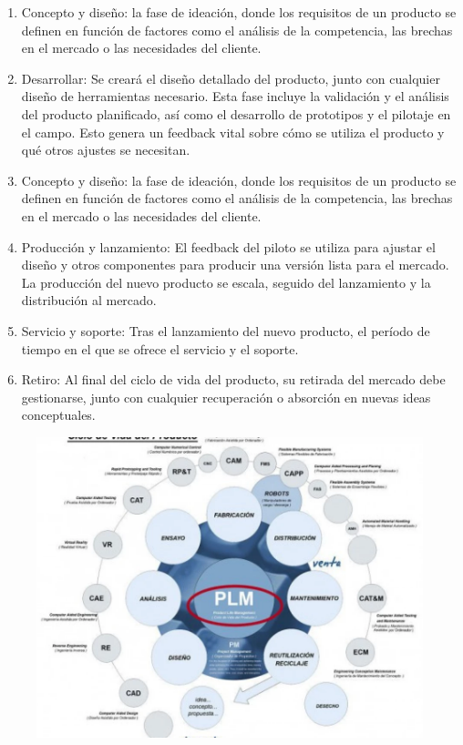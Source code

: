 \documentclass[12pt]{article}
\begin{document}
\begin{enumerate}
    \item Concepto y diseño: la fase de ideación, donde los requisitos de un producto se definen en función de factores como el análisis de la competencia, 
    las brechas en el mercado o las necesidades del cliente.
    \item Desarrollar: Se creará el diseño detallado del producto, junto con cualquier diseño de herramientas necesario. Esta fase incluye la validación y el 
    análisis del producto planificado, así como el desarrollo de prototipos y el pilotaje en el campo. Esto genera un feedback vital sobre cómo se utiliza el producto y qué otros ajustes se necesitan.
    \item Concepto y diseño: la fase de ideación, donde los requisitos de un producto se definen en función de factores como el análisis de la competencia, las brechas en el mercado o las necesidades 
    del cliente.
    \item Producción y lanzamiento: El feedback del piloto se utiliza para ajustar el diseño y otros componentes para producir una versión lista para el mercado. La producción del nuevo producto se escala, 
    seguido del lanzamiento y la distribución al mercado.
    \item Servicio y soporte: Tras el lanzamiento del nuevo producto, el período de tiempo en el que se ofrece el servicio y el soporte.
    \item Retiro: Al final del ciclo de vida del producto, su retirada del mercado debe gestionarse, junto con cualquier recuperación o absorción en nuevas ideas conceptuales.
\end{enumerate}

\begin{figure}[h!]
    \centering
    \includegraphics[width=.8\textwidth]{Funciones.jpg}
    \label{fig:my_label}
\end{figure}
\end{document}
